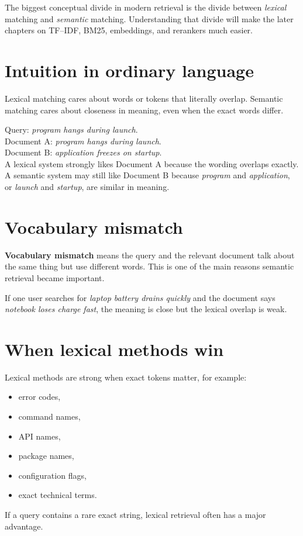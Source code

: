 \documentclass[11pt,oneside]{report}
\newcommand{\term}[1]{\textbf{#1}}
\begin{document}
\begin{purposebox}
The biggest conceptual divide in modern retrieval is the divide between \emph{lexical} matching and \emph{semantic} matching. Understanding that divide will make the later chapters on TF--IDF, BM25, embeddings, and rerankers much easier.
\end{purposebox}

\section*{Intuition in ordinary language}
Lexical matching cares about words or tokens that literally overlap. Semantic matching cares about closeness in meaning, even when the exact words differ.

\begin{examplebox}
Query: \emph{program hangs during launch}.\\
Document A: \emph{program hangs during launch}.\\
Document B: \emph{application freezes on startup}.\\
A lexical system strongly likes Document A because the wording overlaps exactly. A semantic system may still like Document B because \emph{program} and \emph{application}, or \emph{launch} and \emph{startup}, are similar in meaning.
\end{examplebox}

\section*{Vocabulary mismatch}
\term{Vocabulary mismatch} means the query and the relevant document talk about the same thing but use different words. This is one of the main reasons semantic retrieval became important.

\begin{intuitionbox}
If one user searches for \emph{laptop battery drains quickly} and the document says \emph{notebook loses charge fast}, the meaning is close but the lexical overlap is weak.
\end{intuitionbox}

\section*{When lexical methods win}
Lexical methods are strong when exact tokens matter, for example:
\begin{itemize}
\item error codes,
\item command names,
\item API names,
\item package names,
\item configuration flags,
\item exact technical terms.
\end{itemize}
If a query contains a rare exact string, lexical retrieval often has a major advantage.
\end{document}
